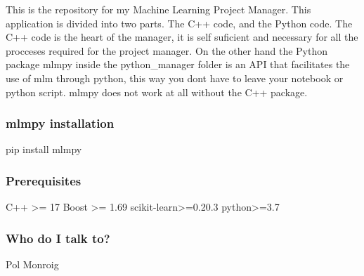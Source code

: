 This is the repository for my Machine Learning Project Manager. This application is divided into two parts. The C++ code, and the Python code. The C++ code is the heart of the manager, it is self suficient and necessary for all the procceses required for the project manager. On the other hand the Python package mlmpy inside the python\+\_\+manager folder is an A\+PI that facilitates the use of mlm through python, this way you don\textquotesingle{}t have to leave your notebook or python script. mlmpy does not work at all without the C++ package.

\subsubsection*{mlmpy installation}

\begin{DoxyVerb}pip install mlmpy
\end{DoxyVerb}


\subsubsection*{Prerequisites}

\begin{DoxyVerb}C++ >= 17
Boost >= 1.69
scikit-learn>=0.20.3
python>=3.7
\end{DoxyVerb}


\subsubsection*{Who do I talk to?}

Pol Monroig 